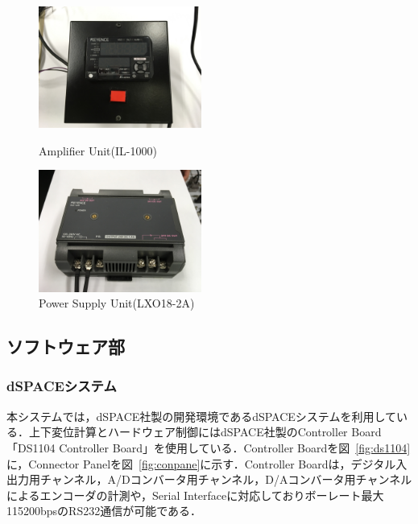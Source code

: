 \documentclass[a4paper,12pt]{article_vdlab_sotsuron}
\begin{document}
\vspace*{10mm}
\begin{figure}[htp]
  \begin{minipage}{0.5\textwidth}
    \begin{center}
      \includegraphics[height=40mm]{figure/il_1500.eps}
      \vspace*{3mm}
      \caption{Amplifier Unit(IL-1000)}
      \label{fig:il_1500}
    \end{center}
  \end{minipage}
  \begin{minipage}{0.5\textwidth}
    \begin{center}
      \includegraphics[height=40mm]{figure/lxo18_2a.eps}
      \vspace*{3mm}
      \caption{Power Supply Unit(LXO18-2A)}
      \label{fig:lxo18_2a}
    \end{center}
  \end{minipage}
\end{figure}

\subsection{ソフトウェア部}
\subsubsection{dSPACEシステム}
本システムでは，dSPACE社製の開発環境であるdSPACEシステムを利用している．上下変位計算とハードウェア制御にはdSPACE社製のController Board「DS1104 Controller Board」を使用している．Controller Boardを図~\ref{fig:ds1104}に，Connector Panelを図~\ref{fig:conpane}に示す．Controller Boardは，デジタル入出力用チャンネル，A/Dコンバータ用チャンネル，D/Aコンバータ用チャンネルによるエンコーダの計測や，Serial Interfaceに対応しておりボーレート最大115200bpsのRS232通信が可能である．
\end{document}
